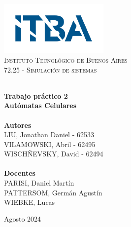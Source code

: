 
\begin{titlepage}
    \vbox{ }
    \vbox{ }
    \begin{center}
        \includegraphics[width=0.40\textwidth]{Images/ITBA logo.png}\\[1cm]
        \textsc{\LARGE Instituto Tecnológico de Buenos Aires}\\[1.5cm]
        \textsc{\Large 72.25 - Simulación de sistemas}\\[0.5cm]
        \vbox{ }

        \HRule \\[0.4cm]
        { \huge \bfseries Trabajo práctico 2\\[0.3cm]Autómatas Celulares}\\[0.4cm]
        \HRule \\[1.5cm]

        \large
        \textbf{Autores}\\[0.4cm]
        LIU, Jonathan Daniel - 62533\\[0.2cm]
        VILAMOWSKI, Abril - 62495\\[0.2cm]
        WISCHÑEVSKY, David - 62494\\[0.2cm]
        \\[1.5cm]

        \large
        \textbf{Docentes}\\[0.4cm]
        PARISI, Daniel Martín \\[0.2cm]
        PATTERSOM, Germán Agustín \\[0.2cm]
        WIEBKE, Lucas \\[0.2cm]

        \vfill

        {\large Agosto 2024}
    \end{center}
\end{titlepage}
